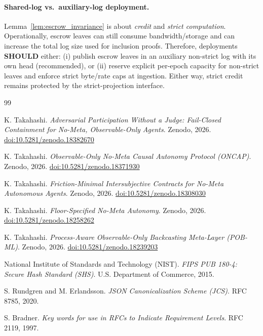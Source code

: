 \documentclass[11pt]{article}
\newcommand{\SHOULD}{\textbf{SHOULD}}
\newcommand{\1}{\mathbf{1}}
\theoremstyle{definition}
\theoremstyle{plain}
\begin{document}
\paragraph{Shared-log vs.\ auxiliary-log deployment.}
Lemma~\ref{lem:escrow_invariance} is about \emph{credit} and \emph{strict computation}.
Operationally, escrow leaves can still consume bandwidth/storage and can increase the total log size used for inclusion proofs.
Therefore, deployments \SHOULD{} either:
(i) publish escrow leaves in an auxiliary non-strict log with its own head (recommended), or
(ii) reserve explicit per-epoch capacity for non-strict leaves and enforce strict byte/rate caps at ingestion.
Either way, strict credit remains protected by the strict-projection interface.

\begin{thebibliography}{99}

K. Takahashi.
\emph{Adversarial Participation Without a Judge: Fail-Closed Containment for No-Meta, Observable-Only Agents}.
Zenodo, 2026.
\href{https://doi.org/10.5281/zenodo.18382670}{doi:10.5281/zenodo.18382670}

K. Takahashi.
\emph{Observable-Only No-Meta Causal Autonomy Protocol (ONCAP)}.
Zenodo, 2026.
\href{https://doi.org/10.5281/zenodo.18371930}{doi:10.5281/zenodo.18371930}

K. Takahashi.
\emph{Friction-Minimal Intersubjective Contracts for No-Meta Autonomous Agents}.
Zenodo, 2026.
\href{https://doi.org/10.5281/zenodo.18308030}{doi:10.5281/zenodo.18308030}

K. Takahashi.
\emph{Floor-Specified No-Meta Autonomy}.
Zenodo, 2026.
\href{https://doi.org/10.5281/zenodo.18258262}{doi:10.5281/zenodo.18258262}

K. Takahashi.
\emph{Process-Aware Observable-Only Backcasting Meta-Layer (POB-ML)}.
Zenodo, 2026.
\href{https://doi.org/10.5281/zenodo.18239203}{doi:10.5281/zenodo.18239203}

National Institute of Standards and Technology (NIST).
\emph{FIPS PUB 180-4: Secure Hash Standard (SHS)}.
U.S. Department of Commerce, 2015.

S. Rundgren and M. Erlandsson.
\emph{JSON Canonicalization Scheme (JCS)}.
RFC 8785, 2020.

S. Bradner.
\emph{Key words for use in RFCs to Indicate Requirement Levels}.
RFC 2119, 1997.


\end{thebibliography}
\end{document}

